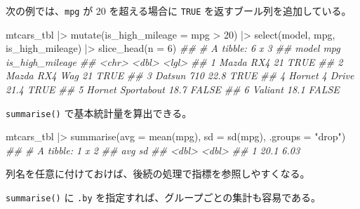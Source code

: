 \documentclass[
  letterpaper,
  xelatex,
  ja=standard, xelatex]{bxjsbook}
\newenvironment{Shaded}{\begin{snugshade}}{\end{snugshade}}
\newcommand{\AttributeTok}[1]{\textcolor[rgb]{0.40,0.45,0.13}{#1}}
\newcommand{\DecValTok}[1]{\textcolor[rgb]{0.68,0.00,0.00}{#1}}
\newcommand{\DocumentationTok}[1]{\textcolor[rgb]{0.37,0.37,0.37}{\textit{#1}}}
\newcommand{\FunctionTok}[1]{\textcolor[rgb]{0.28,0.35,0.67}{#1}}
\newcommand{\NormalTok}[1]{\textcolor[rgb]{0.00,0.23,0.31}{#1}}
\newcommand{\SpecialCharTok}[1]{\textcolor[rgb]{0.37,0.37,0.37}{#1}}
\newcommand{\StringTok}[1]{\textcolor[rgb]{0.13,0.47,0.30}{#1}}
\begin{document}
次の例では、\texttt{mpg} が 20 を超える場合に \texttt{TRUE}
を返すブール列を追加している。

\begin{Shaded}
\begin{Highlighting}[]
\NormalTok{mtcars\_tbl }\SpecialCharTok{|\textgreater{}} 
  \FunctionTok{mutate}\NormalTok{(}\AttributeTok{is\_high\_mileage =}\NormalTok{ mpg }\SpecialCharTok{\textgreater{}} \DecValTok{20}\NormalTok{) }\SpecialCharTok{|\textgreater{}} 
  \FunctionTok{select}\NormalTok{(model, mpg, is\_high\_mileage) }\SpecialCharTok{|\textgreater{}} 
  \FunctionTok{slice\_head}\NormalTok{(}\AttributeTok{n =} \DecValTok{6}\NormalTok{)}
\DocumentationTok{\#\# \# A tibble: 6 x 3}
\DocumentationTok{\#\#   model               mpg is\_high\_mileage}
\DocumentationTok{\#\#   \textless{}chr\textgreater{}             \textless{}dbl\textgreater{} \textless{}lgl\textgreater{}          }
\DocumentationTok{\#\# 1 Mazda RX4          21   TRUE           }
\DocumentationTok{\#\# 2 Mazda RX4 Wag      21   TRUE           }
\DocumentationTok{\#\# 3 Datsun 710         22.8 TRUE           }
\DocumentationTok{\#\# 4 Hornet 4 Drive     21.4 TRUE           }
\DocumentationTok{\#\# 5 Hornet Sportabout  18.7 FALSE          }
\DocumentationTok{\#\# 6 Valiant            18.1 FALSE}
\end{Highlighting}
\end{Shaded}

\texttt{summarise()} で基本統計量を算出できる。

\begin{Shaded}
\begin{Highlighting}[]
\NormalTok{mtcars\_tbl }\SpecialCharTok{|\textgreater{}} 
  \FunctionTok{summarise}\NormalTok{(}\AttributeTok{avg =} \FunctionTok{mean}\NormalTok{(mpg), }
            \AttributeTok{sd  =} \FunctionTok{sd}\NormalTok{(mpg), }
            \AttributeTok{.groups =} \StringTok{"drop"}\NormalTok{)}
\DocumentationTok{\#\# \# A tibble: 1 x 2}
\DocumentationTok{\#\#     avg    sd}
\DocumentationTok{\#\#   \textless{}dbl\textgreater{} \textless{}dbl\textgreater{}}
\DocumentationTok{\#\# 1  20.1  6.03}
\end{Highlighting}
\end{Shaded}

列名を任意に付けておけば、後続の処理で指標を参照しやすくなる。

\texttt{summarise()} に \texttt{.by}
を指定すれば、グループごとの集計も容易である。
\end{document}

